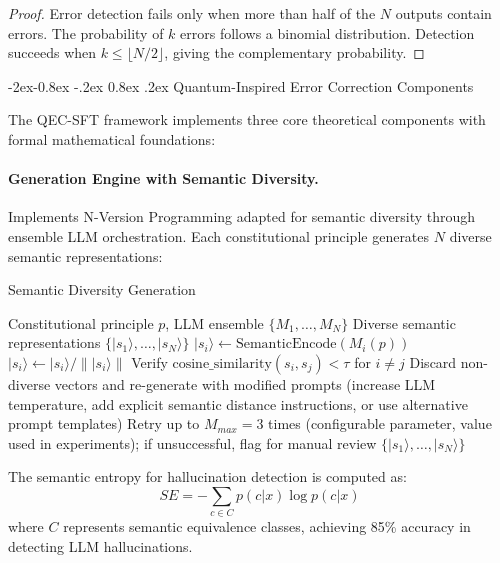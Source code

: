 \documentclass[manuscript,screen,9pt]{acmart}
\makeatletter
\renewcommand\subsubsection{\@startsection{subsubsection}{3}{\z@}%
  {-2ex\@plus -0.8ex \@minus -.2ex}%
  {0.8ex \@plus .2ex}%
  {\normalfont\normalsize\bfseries}}
\makeatother
\begin{document}
\begin{proof}
Error detection fails only when more than half of the $N$ outputs contain errors. The probability of $k$ errors follows a binomial distribution. Detection succeeds when $k \leq \lfloor N/2 \rfloor$, giving the complementary probability.
\end{proof}

\subsubsection{Quantum-Inspired Error Correction Components}
\label{subsubsec:quantum_error_correction}

The QEC-SFT framework implements three core theoretical components with formal mathematical foundations:

\paragraph{Generation Engine with Semantic Diversity.} Implements N-Version Programming adapted for semantic diversity through ensemble LLM orchestration. Each constitutional principle generates $N$ diverse semantic representations:

\begin{algorithm}[H]
\caption{Semantic Diversity Generation}
\label{alg:semantic_diversity}
\begin{algorithmic}[1]
\Require Constitutional principle $p$, LLM ensemble $\{M_1, \ldots, M_N\}$
\Ensure Diverse semantic representations $\{|s_1\rangle, \ldots, |s_N\rangle\}$
    \State $|s_i\rangle \leftarrow \text{SemanticEncode}(M_i(p))$
    \State $|s_i\rangle \leftarrow |s_i\rangle / \||s_i\rangle\|$ 
\EndFor
\State Verify $\text{cosine\_similarity}(s_i, s_j) < \tau$ for $i \neq j$ 
    \State Discard non-diverse vectors and re-generate with modified prompts (increase LLM temperature, add explicit semantic distance instructions, or use alternative prompt templates)
    \State Retry up to $M_{max} = 3$ times (configurable parameter, value used in experiments); if unsuccessful, flag for manual review
\EndIf
\State \Return $\{|s_1\rangle, \ldots, |s_N\rangle\}$
\end{algorithmic}
\end{algorithm}

The semantic entropy for hallucination detection is computed as:
$$SE = -\sum_{c \in C} p(c|x) \log p(c|x)$$
where $C$ represents semantic equivalence classes, achieving 85\% accuracy in detecting LLM hallucinations.
\end{document}
